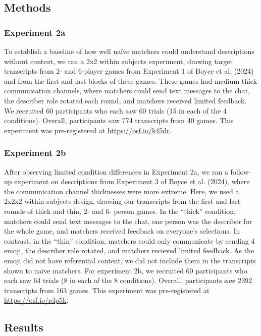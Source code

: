 \documentclass[10pt, letterpaper]{article}
\begin{document}
\subsection{Methods}\label{methods-1}

\subsubsection{Experiment 2a}\label{experiment-2a}

To establish a baseline of how well naïve matchers could understand
descriptions without context, we ran a 2x2 within subjects experiment,
drawing target transcripts from 2- and 6-player games from Experiment 1
of Boyce et al. (2024) and from the first and last blocks of these
games. These games had medium-thick communication channels, where
matchers could send text messages to the chat, the describer role
rotated each round, and matchers received limited feedback. We recruited
60 participants who each saw 60 trials (15 in each of the 4 conditions).
Overall, participants saw 774 transcripts from 40 games. This experiment
was pre-registered at \url{https://osf.io/k45dr}.

\subsubsection{Experiment 2b}\label{experiment-2b}

After observing limited condition differences in Experiment 2a, we ran a
follow-up experiment on descriptions from Experiment 3 of Boyce et al.
(2024), where the communication channel thicknesses were more extreme.
Here, we used a 2x2x2 within subjects design, drawing our transcripts
from the first and last rounds of thick and thin, 2- and 6- person
games. In the ``thick'' condition, matchers could send text messages to
the chat, one person was the describer for the whole game, and matchers
received feedback on everyone's selections. In contrast, in the ``thin''
condition, matchers could only communicate by sending 4 emoji, the
describer role rotated, and matchers recieved limited feedback. As the
emoji did not have referential content, we did not include them in the
transcripts shown to naïve matchers. For experiment 2b, we recruited 60
participants who each saw 64 trials (8 in each of the 8 conditions).
Overall, participants saw 2392 transcripts from 163 games. This
experiment was pre-registered at \url{https://osf.io/rdp5k}.

\subsection{Results}\label{results}
\end{document}
